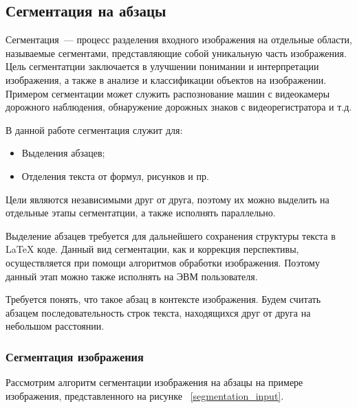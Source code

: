 \subsection{Сегментация на абзацы}

Сегментация~--- процесс разделения входного изображения на отдельные области, называемые сегментами, представляющие собой уникальную часть изображения. Цель сегментатции заключается в улучшении понимании и интерпретации изображения, а также в анализе и классификации объектов на изображении.
Примером сегментации может служить распознование машин с видеокамеры дорожного наблюдения, обнаружение дорожных знаков с видеорегистратора и т.д.

В данной работе сегментация служит для:
\begin{itemize}
    \item Выделения абзацев;
    \item Отделения текста от формул, рисунков и пр.
\end{itemize}

Цели являются независимыми друг от друга, поэтому их можно выделить на отдельные этапы сегментатции, а также исполнять параллельно. 

Выделение абзацев требуется для дальнейшего сохранения структуры текста в \LaTeX\; коде. Данный вид сегментации, как и коррекция перспективы, осуществляется при помощи алгоритмов обработки изображения.
Поэтому данный этап можно также исполнять на ЭВМ пользователя.

Требуется понять, что такое абзац в контексте изображения. Будем считать абзацем последовательность строк текста, находящихся друг от друга на небольшом расстоянии.

\subsubsection{Сегментация изображения}

Рассмотрим алгоритм сегментации изображения на абзацы на примере изображения, представленного на рисунке ~\ref{segmentation_input}.

